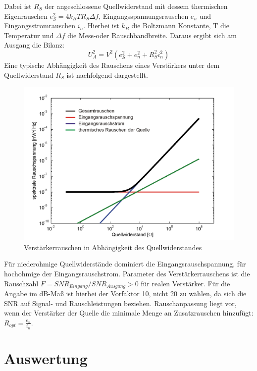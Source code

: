 \documentclass{article}						%
\begin{document}
		 Dabei ist $R_{S}$ der angeschlossene Quellwiderstand mit dessem thermischen Eigenrauschen $e_{S}^2=4k_{B} TR_{S} \Delta f$, Eingangsspannungsrauschen $e_{n}$ und Eingangsstromrauschen $i_{n}$. Hierbei ist $k_{B} $ die Boltzmann Konstante, T die Temperatur und $\Delta f$ die Mess-oder Rauschbandbreite. Daraus ergibt sich am Ausgang die Bilanz:
		 \begin{equation}
		 	U_{A}^2=V^2 \left( e_{S}^2+e_{n}^2+R_{S}^2i_{n}^2 \right)
		 \end{equation}
		 Eine typische Abhängigkeit des Rauschens eines Verstärkers unter dem Quellwiderstand $R_{S}$ ist nachfolgend dargestellt.
		 \begin{figure}[h!]
		 	\centering
		 	\includegraphics[scale=0.3]{Verstaerkerrauschen}
		 	\caption{Verstärkerrauschen in Abhängigkeit des Quellwiderstandes}
		 \end{figure}
		 \newline
		 Für niederohmige Quellwiderstände dominiert die Eingangsrauschspannung, für hochohmige der Eingangsrauschstrom. 
		 Parameter des Verstärkerrauschens ist die Rauschzahl $F=SNR_{Eingang}/SNR_{Ausgang}>0$ für realen Verstärker. Für die Angabe im dB-Maß ist hierbei der Vorfaktor 10, nicht 20 zu wählen, da sich die SNR auf Signal- und Rauschleistungen beziehen. Rauschanpassung liegt vor, wenn der Verstärker der Quelle die minimale Menge an Zusatzrauschen hinzufügt: $R_{opt}=\frac{e_{n}}{i_{n}}$.
\clearpage
				 
\section{Auswertung}
\end{document}
